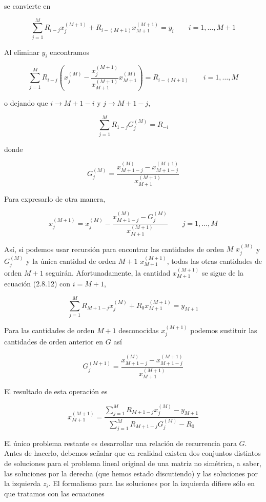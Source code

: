 \documentclass[10pt,a4paper]{book}
\begin{document}
se convierte en

\[
\sum_{j=1}^{M} R_{i-j} x_j^{(M+1)} + R_{i-(M+1)} x_{M+1}^{(M+1)} = y_i \qquad i = 1, \ldots, M + 1
\tag{2.8.12}
\]

Al eliminar $y_i$ encontramos

\[
\sum_{j=1}^{M} R_{i-j} \left(x_j^{(M)} - \frac{x_j^{(M+1)}}{x_{M+1}^{(M+1)}} x_{M+1}^{(M)}\right) = R_{i - (M+1)} \qquad i = 1, \ldots, M
\tag{2.8.13}
\]

o dejando que $i \rightarrow M + 1 - i$ y $j \rightarrow M + 1 - j$,

\[
\sum_{j=1}^{M} R_{1-j} G_j^{(M)} = R_{-i}
\tag{2.8.14}
\]

donde

\[
G_j^{(M)} = \frac{x_{M+1-j}^{(M)} - x_{M+1-j}^{(M+1)}}{x_{M+1}^{(M+1)}}
\tag{2.8.15}
\]

Para expresarlo de otra manera,

\[
x_j^{(M+1)} = x_j^{(M)} - \frac{x_{M+1-j}^{(M)} - G_j^{(M)}}{x_{M+1}^{(M+1)}} \qquad j = 1, \ldots, M
\tag{2.8.16}
\]

Así, si podemos usar recursión para encontrar las cantidades de orden $M$ $x_j^{(M)}$ y $G_j^{(M)}$ y la única cantidad de orden $M+1$ $x_{M+1}^{(M+1)}$, todas las otras cantidades de orden $M+1$ seguirán. Afortunadamente, la cantidad $x_{M+1}^{(M+1)}$ se sigue de la ecuación (2.8.12) con $i = M + 1$,

\[
\sum_{j=1}^{M} R_{M+1-j} x_j^{(M)} + R_0 x_{M+1}^{(M+1)} = y_{M+1}
\tag{2.8.17}
\]

Para las cantidades de orden $M+1$ desconocidas $x_j^{(M+1)}$ podemos sustituir las cantidades de orden anterior en $G$ así

\[
G_j^{(M+1)} = \frac{x_{M+1-j}^{(M)} - x_{M+1-j}^{(M+1)}}{x_{M+1}^{(M+1)}}
\tag{2.8.18}
\]

El resultado de esta operación es

\[
x_{M+1}^{(M+1)} = \frac{\sum_{j=1}^{M} R_{M+1-j} x_j^{(M)} - y_{M+1}}{\sum_{j=1}^{M} R_{M+1-j} G_j^{(M)} - R_0}
\tag{2.8.19}
\]

El único problema restante es desarrollar una relación de recurrencia para $G$. Antes de hacerlo, debemos señalar que en realidad existen dos conjuntos distintos de soluciones para el problema lineal original de una matriz no simétrica, a saber, las soluciones por la derecha (que hemos estado discutiendo) y las soluciones por la izquierda $z_i$. El formalismo para las soluciones por la izquierda difiere sólo en que tratamos con las ecuaciones
\end{document}
